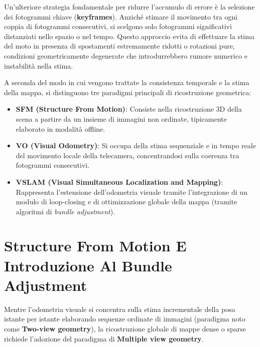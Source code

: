 ﻿\documentclass[11pt, a4paper]{article}
\begin{document}

Un'ulteriore strategia fondamentale per ridurre l'accumulo di errore è la selezione dei fotogrammi chiave (\textbf{keyframes}). Anziché stimare il movimento tra ogni coppia di fotogrammi consecutivi, si scelgono solo fotogrammi significativi distanziati nello spazio o nel tempo. Questo approccio evita di effettuare la stima del moto in presenza di spostamenti estremamente ridotti o rotazioni pure, condizioni geometricamente degenerate che introdurrebbero rumore numerico e instabilità nella stima.


A seconda del modo in cui vengono trattate la consistenza temporale e la stima della mappa, si distinguono tre paradigmi principali di ricostruzione geometrica:
\begin{itemize}
    \item \textbf{SFM (Structure From Motion)}: Consiste nella ricostruzione 3D della scena a partire da un insieme di immagini non ordinate, tipicamente elaborato in modalità offline.
    \item \textbf{VO (Visual Odometry)}: Si occupa della stima sequenziale e in tempo reale del movimento locale della telecamera, concentrandosi sulla coerenza tra fotogrammi consecutivi.
    \item \textbf{VSLAM (Visual Simultaneous Localization and Mapping)}: Rappresenta l'estensione dell'odometria visuale tramite l'integrazione di un modulo di loop-closing e di ottimizzazione globale della mappa (tramite algoritmi di \emph{bundle adjustment}).
\end{itemize}

\newpage

\section{Structure From Motion E Introduzione Al Bundle Adjustment}

Mentre l'odometria visuale si concentra sulla stima incrementale della posa istante per istante elaborando sequenze ordinate di immagini (paradigma noto come \textbf{Two-view geometry}), la ricostruzione globale di mappe dense o sparse richiede l'adozione del paradigma di \textbf{Multiple view geometry}.
\end{document}
